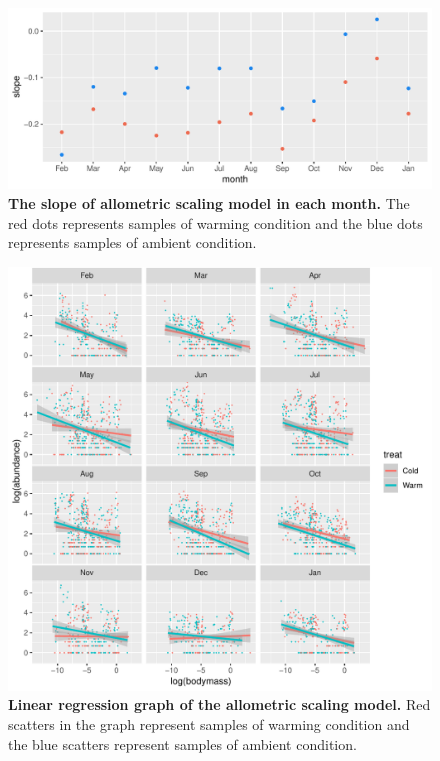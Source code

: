 \documentclass[11pt]{article}
\begin{document}
\begin{linenumbers}
\begin{figure}[H]
  \centering
  \includegraphics[scale = 0.8]{../Graph/ascoefplot.pdf}
  \caption{\textbf{The slope of allometric scaling model in each month.}  The red dots represents samples of warming condition and the blue dots represents samples of ambient condition. }
\end{figure}

\begin{figure}[H]
  \centering
  \includegraphics{../Graph/as12l.pdf}
  \caption{\textbf{Linear regression graph of the allometric scaling model.}
  Red scatters in the graph represent samples of warming condition and the blue scatters represent samples of ambient condition. }
\end{figure}


\end{linenumbers}
\end{document}
